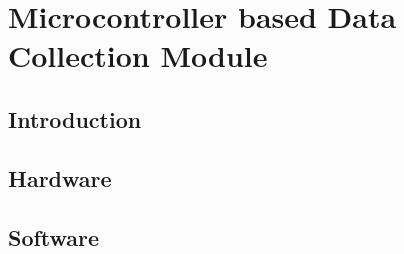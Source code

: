 \chapter{Microcontroller based Data Collection Module}

\section{Introduction}
\section{Hardware}
\section{Software}

